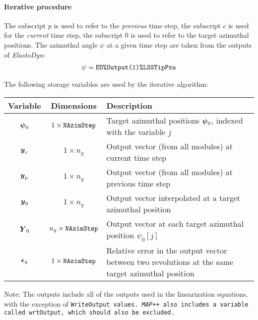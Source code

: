 \documentclass[11pt]{article}
\begin{document}
\paragraph{Iterative procedure}
The subscript $p$ is used to refer to the \textit{previous} time step, the subscript $c$ is used for the \textit{current} time step, the subscript $0$ is used to refer to the target azimuthal positions.
% 
The azimuthal angle $\psi$ 
at a given time step are taken from the outputs of \textit{ElastoDyn}: 
\begin{align}
    \psi = \tt{ED\%Output(1)\%LSSTipPxa}
\end{align}


% 
% 
% 
The following storage variables are used by the iterative algorithm:
\begin{table}[!h]\centering
\begin{tabular}{ccp{10cm}}
\textbf{Variable} & \textbf{Dimensions}& \textbf{Description}\\
\hline
$\v{\psi}_0$ & $1\times \tt{NAzimStep}$ & Target azimuthal positions $\v{\psi}_0$, indexed with the variable $j$ \\
$\v{y}_c$ & $1\times n_y$ & Output vector (from all modules) at current time step \\
$\v{y}_p$ & $1\times n_y$ & Output vector (from all modules) at previous time step \\
$\v{y}_0$ & $1\times n_y$ & Output vector interpolated at a target azimuthal position \\
$\m{Y}_0$ & $n_{y}\times \tt{NAzimStep}$ & Output vector at each target azimuthal position $\psi_0[j]$ \\
$\v{\epsilon}_y$ & $1 \times \tt{NAzimStep}$ & Relative error in the output vector between two revolutions at the same target azimuthal position \\
\hline
\end{tabular}
\end{table}

Note: The outputs include all of the outputs used in the linearization equations, with the exception of \tt{WriteOutput} values.
\textit{MAP++} also includes a variable called \tt{wrtOutput}, which should also be excluded.
\end{document}
